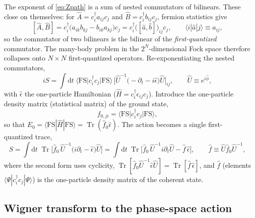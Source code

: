 \documentclass[11pt]{article}
\theoremstyle{remark}
\begin{document}
The exponent of \eqref{eq:Zpath} is a sum of nested commutators of bilinears.
These close on themselves: for $\hat A=c_i^\dagger a_{ij}c_j$ and
$\hat B=c_i^\dagger b_{ij}c_j$, fermion statistics give
\begin{equation}
\label{eq:bilinearcomm}
[\hat A,\hat B] = c_i^\dagger\big(a_{ik}b_{kj}-b_{ik}a_{kj}\big)c_j
= c_i^\dagger\big([\hat a,\hat b]\big)_{ij}c_j ,
\qquad \langle i|\hat a|j\rangle \equiv a_{ij},
\end{equation}
so the commutator of two bilinears is the bilinear of the \emph{first-quantized}
commutator. The many-body problem in the $2^N$-dimensional Fock space therefore
collapses onto $N\times N$ first-quantized operators. Re-exponentiating the nested
commutators,
\begin{equation}
\label{eq:iS}
iS = \int \mathrm{d} t\;
\big\langle \mathrm{FS}\big|c_i^\dagger c_j\big|\mathrm{FS}\big\rangle\,
\big[\hat U^{-1}\big(-\partial_t - i\hat\epsilon\big)\hat U\big]_{ij},
\qquad \hat U \equiv e^{i\hat\phi},
\end{equation}
with $\hat\epsilon$ the one-particle Hamiltonian
($\hat H = c_i^\dagger \epsilon_{ij}c_j$). Introduce the one-particle density
matrix (statistical matrix) of the ground state,
\begin{equation}
\label{eq:f0matrix}
f_{0,ji} = \big\langle \mathrm{FS}\big|c_i^\dagger c_j\big|\mathrm{FS}\big\rangle,
\end{equation}
so that $E_0=\langle\mathrm{FS}|\hat H|\mathrm{FS}\rangle=\operatorname{Tr}(\hat f_0\hat\epsilon)$.
The action becomes a single first-quantized trace,
\begin{equation}
\label{eq:Strace}
S = \int \mathrm{d} t\;\operatorname{Tr}\!\big[\hat f_0\,\hat U^{-1}\big(i\partial_t-\hat\epsilon\big)\hat U\big]
= \int \mathrm{d} t\;\operatorname{Tr}\!\big[\hat f_0\,\hat U^{-1} i\partial_t \hat U - \hat f\,\hat\epsilon\big],
\qquad \hat f \equiv \hat U \hat f_0 \hat U^{-1},
\end{equation}
where the second form uses cyclicity,
$\operatorname{Tr}[\hat f_0\hat U^{-1}\hat\epsilon\hat U]=\operatorname{Tr}[\hat f\,\hat\epsilon]$, and
$\hat f$ (elements $\langle\Psi|c_i^\dagger c_j|\Psi\rangle$) is the one-particle
density matrix of the coherent state.

\subsection{Wigner transform to the phase-space action}
\end{document}

